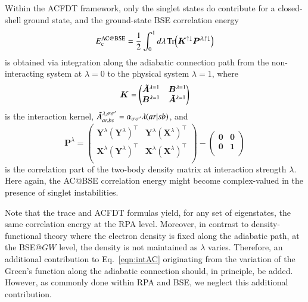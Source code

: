 \documentclass[aps,prb,reprint,superscriptaddress]{revtex4-1}
\makeatletter
\newcommand{\IS}{\lambda}
\newcommand{\T}[1]{#1^{\intercal}}
\newcommand{\singlet}{\uparrow\downarrow}
\newcommand{\EcACBSE}{E_\text{c}^\text{AC@BSE}}
\newcommand{\tA}[2]{\Tilde{A}_{#1}^{#2}}
\newcommand{\ERI}[2]{(#1|#2)}
\newcommand{\bO}{\boldsymbol{0}}
\newcommand{\bI}{\boldsymbol{1}}
\newcommand{\btA}[1]{\Tilde{\boldsymbol{A}}^{#1}}
\newcommand{\bB}[1]{\boldsymbol{B}^{#1}}
\newcommand{\bX}[1]{\boldsymbol{X}^{#1}}
\newcommand{\bY}[1]{\boldsymbol{Y}^{#1}}
\newcommand{\bK}{\boldsymbol{K}}
\newcommand{\bP}[1]{\boldsymbol{P}^{#1}}
\makeatother
\begin{document}
Within the ACFDT framework, only the singlet states do contribute for a closed-shell ground state, and the ground-state BSE correlation energy 
\begin{equation}
	\EcACBSE = \frac{1}{2} \int_0^1 d\IS \Tr(\bK^{\singlet} \bP{\IS,\singlet}) 
	\label{eqn:intAC}
\end{equation}
is obtained via integration along the adiabatic connection path from the non-interacting system at $\IS = 0$ to the physical system $\IS = 1$, where
\begin{equation}
\label{eq:K}
	\bK = 
	\begin{pmatrix}
		\btA{\IS=1}	&	\bB{\IS=1}	\\
		\bB{\IS=1}	&	\btA{\IS=1}	\\
	\end{pmatrix}
\end{equation}
is the interaction kernel, \citep{Angyan_2011,Holzer_2018b,Loos_2020e} $\tA{ar,bs}{\IS,\sigma\sigma'} = \alpha_{\sigma\sigma'} \IS \ERI{ar}{sb}$, and
\begin{equation}
\label{eq:2DM}
	\bP{\IS} = 
	\begin{pmatrix}
		\bY{\IS} \T{(\bY{\IS})}		&	\bY{\IS} \T{(\bX{\IS})}	\\
		\bX{\IS} \T{(\bY{\IS})}		&	\bX{\IS} \T{(\bX{\IS})}	\\
	\end{pmatrix}
	-
	\begin{pmatrix}
		\bO		&	\bO	\\
		\bO		&	\bI	\\
	\end{pmatrix}
\end{equation} 
is the correlation part of the two-body density matrix at interaction strength $\IS$.
Here again, the AC@BSE correlation energy might become complex-valued in the presence of singlet instabilities.

Note that the trace and ACFDT formulas yield, for any set of eigenstates, the same correlation energy at the RPA level. \citep{Angyan_2011}
Moreover, in contrast to density-functional theory where the electron density is fixed along the adiabatic path, \citep{Langreth_1975,Gunnarsson_1976,Zhang_2004} at the BSE@$GW$ level, the density is not maintained as $\IS$ varies. Therefore, an additional contribution to Eq.~\eqref{eqn:intAC} originating from the variation of the Green's function along the adiabatic connection should, in principle, be added. However, as commonly done within RPA  \citep{Toulouse_2009,Toulouse_2010,Angyan_2011,Colonna_2014} and BSE, \citep{Holzer_2018b,Loos_2020e} we neglect this additional contribution.
\end{document}
